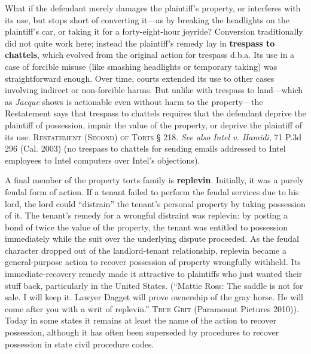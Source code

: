 
What if the defendant merely damages the plaintiff's property, or interferes
with its use, but stops short of converting it---as by breaking the headlights
on the plaintiff's car, or taking it for a forty-eight-hour joyride? Conversion
traditionally did not quite work here; instead the plaintiff's remedy lay in
\textbf{trespass to chattels}, which evolved from the original action for
trespass d.b.a. Its use in a case of forcible misuse (like smashing headlights
or temporary taking) was straightforward enough. Over time, courts extended its
use to other cases involving indirect or non-forcible harms. But unlike with
trespass to land---which as \textit{Jacque} shows is actionable even without
harm to the property---the Restatement says that trespass to chattels requires
that the defendant deprive the plaintiff of possession, impair the value of the
property, or deprive the plaintiff of its use. \textsc{Restatement (Second) of
Torts} {\S} 218. \textit{See also} \textit{Intel v. Hamidi}, 71 P.3d 296 (Cal.
2003) (no trespass to chattels for sending emails addressed to Intel employees
to Intel computers over Intel's objections).

A final member of the property torts family is \textbf{replevin}. Initially, it
was a purely feudal form of action. If a tenant failed to perform the feudal
services due to his lord, the lord could ``distrain'' the tenant's personal
property by taking possession of it. The tenant's remedy for a wrongful
distraint was replevin: by posting a bond of twice the value of the property,
the tenant was entitled to possession immediately while the suit over the
underlying dispute proceeded. As the feudal character dropped out of the
landlord-tenant relationship, replevin became a general-purpose action to
recover possession of property wrongfully withheld. Its immediate-recovery
remedy made it attractive to plaintiffs who just wanted their stuff back,
particularly in the United States. (``Mattie Ross: The saddle is not
for sale. I will keep it. Lawyer Dagget will prove ownership of the gray horse.
He will come after you with a writ of replevin.'' \textsc{True Grit} (Paramount
Pictures 2010)). Today in some states it remains at least the name of the
action to recover possession, although it has often been superseded by
procedures to recover possession in state civil procedure codes.

